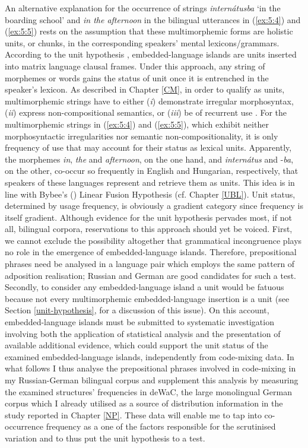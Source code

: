 An alternative explanation for the occurrence of strings \textit{internátusba} `in the boarding school' and \textit{in the afternoon} in the bilingual utterances in (\ref{ex:5:4}) and (\ref{ex:5:5}) rests on the assumption that these multimorphemic forms are holistic units, or chunks, in the corresponding speakers' mental lexicons/grammars. According to the unit hypothesis \cite{backus-evidence-1999,backus-units-2003}, embedded-language islands are units inserted into matrix language clausal frames. Under this approach, any string of morphemes or words gains the status of unit once it is entrenched in the speaker's lexicon. As described in Chapter \ref{CM}, in order to qualify as units, multimorphemic strings have to either (\textit{i}) demonstrate irregular morphosyntax, (\textit{ii}) express non-compositional semantics, or (\textit{iii}) be of recurrent use \citep[90]{backus-units-2003}. For the multimorphemic strings in (\ref{ex:5:4}) and (\ref{ex:5:5}), which exhibit neither morphosyntactic irregularities nor semantic non-compositionality, it is only frequency of use that may account for their status as lexical units. Apparently, the morphemes \textit{in}, \textit{the} and \textit{afternoon}, on the one hand, and \textit{internátus} and -\textit{ba}, on the other, co-occur so frequently in English and Hungarian, respectively, that speakers of these languages represent and retrieve them as units. This idea is in line with Bybee's (\citeyear{bybee-constituency-2002}) Linear Fusion Hypothesis (cf. Chapter \ref{UBL}). Unit status, determined by usage frequency, is obviously a gradient category since frequency is itself gradient. Although evidence for the unit hypothesis pervades most, if not all, bilingual corpora, reservations to this approach should yet be voiced. First, we cannot exclude the possibility altogether that grammatical incongruence plays no role in the emergence of embedded-language islands. Therefore, prepositional phrases need be analysed in a language pair which employs the same pattern of adposition realisation; Russian and German are good candidates for such a test. Secondly, to consider any embedded-language island a unit would be fatuous because not every multimorphemic embedded-language insertion is a unit (see Section \ref{unit-hypothesis}, for a discussion of this issue). On this account, embedded-language islands must be submitted to systematic investigation involving both the application of statistical analysis and the presentation of available additional evidence, which could support the unit status of the examined embedded-language islands, independently from code-mixing data. In what follows I thus analyse the prepositional phrases involved in code-mixing in my Russian-German bilingual corpus and supplement this analysis by measuring the  examined structures’ frequencies in deWaC, the large monolingual German corpus \citep{baroni2006} which I already utilised as a source of distribution information in the study reported in Chapter \ref{NP}. These data will enable me to tap into co-occurrence frequency as a one of the factors responsible for the scrutinised variation and to thus put the unit hypothesis to a test.


